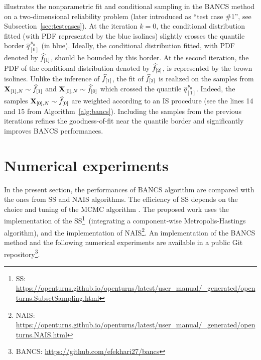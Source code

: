  illustrates the nonparametric fit and conditional sampling in the BANCS method on a two-dimensional reliability problem (later introduced as ``test case \#1'', see Subsection~\ref{sec:testcases}). 
At the iteration $k=0$, the conditional distribution fitted (with PDF represented by the blue isolines) slightly crosses the quantile border $\widehat{q}_{[0]}^{\, p_0}$ (in blue). 
Ideally, the conditional distribution fitted, with PDF denoted by $\widehat{f}_{[1]}$, should be bounded by this border. 
At the second iteration, the PDF of the conditional distribution denoted by $\widehat{f}_{[2]}$, is represented by the brown isolines. 
Unlike the inference of $\widehat{f}_{[1]}$, the fit of $\widehat{f}_{[2]}$ is realized on the samples from ${\bf X}_{[1], N} \sim \widehat{f}_{[1]}$ and ${\bf X}_{[0], N} \sim \widehat{f}_{[0]}$ which crossed the quantile $\widehat{q}_{[1]}^{\, p_0}$. 
Indeed, the samples ${\bf X}_{[0], N} \sim \widehat{f}_{[0]}$ are weighted according to an IS procedure (see the lines 14 and 15 from Algorithm~\ref{alg:bancs}). 
Including the samples from the previous iterations refines the goodness-of-fit near the quantile border and significantly improves BANCS performances. 


\section{Numerical experiments}\label{sec:bancs_bench}
In the present section, the performances of BANCS algorithm are compared with the ones from SS and NAIS algorithms. 
The efficiency of SS depends on the choice and tuning of the MCMC algorithm \citep{Papaioannou_PEM_2015}. 
The proposed work uses the \ots implementation of the SS\footnote{SS: \url{https://openturns.github.io/openturns/latest/user_manual/_generated/openturns.SubsetSampling.html}}~(integrating a component-wise Metropolis-Hastings algorithm), 
and the \ots implementation of NAIS\footnote{NAIS: \url{https://openturns.github.io/openturns/latest/user_manual/_generated/openturns.NAIS.html}}.
An implementation of the BANCS method and the following numerical experiments are available in a public Git repository\footnote{BANCS: \url{https://github.com/efekhari27/bancs}}. 

